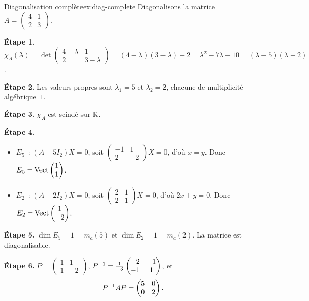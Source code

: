 \begin{example}{Diagonalisation complète}{ex:diag-complete}
  Diagonalisons la matrice
  $A=\begin{pmatrix}4&1\\2&3\end{pmatrix}$.

  \textbf{Étape 1.} $\chi_A(\lambda)=\det\begin{pmatrix}4-\lambda&1\\
  2&3-\lambda\end{pmatrix}=(4-\lambda)(3-\lambda)-2
  =\lambda^2-7\lambda+10=(\lambda-5)(\lambda-2)$.

  \textbf{Étape 2.} Les valeurs propres sont $\lambda_1=5$ et
  $\lambda_2=2$, chacune de multiplicité algébrique~$1$.

  \textbf{Étape 3.} $\chi_A$ est scindé sur ${\mathbb{R}}$.

  \textbf{Étape 4.}
  \begin{itemize}
    \item $E_5$~: $(A-5I_2)X=0$, soit
      $\begin{pmatrix}-1&1\\2&-2\end{pmatrix}X=0$, d'où $x=y$.
      Donc $E_5=\operatorname{Vect}\begin{pmatrix}1\\1\end{pmatrix}$.
    \item $E_2$~: $(A-2I_2)X=0$, soit
      $\begin{pmatrix}2&1\\2&1\end{pmatrix}X=0$, d'où $2x+y=0$.
      Donc $E_2=\operatorname{Vect}\begin{pmatrix}1\\-2\end{pmatrix}$.
  \end{itemize}

  \textbf{Étape 5.} $\dim E_5=1=m_a(5)$ et $\dim E_2=1=m_a(2)$.
  La matrice est diagonalisable.

  \textbf{Étape 6.}
  $P=\begin{pmatrix}1&1\\1&-2\end{pmatrix}$,
  ${P}^{-1}=\frac{1}{-3}\begin{pmatrix}-2&-1\\-1&1\end{pmatrix}$, et
  \[
    {P}^{-1}AP=\begin{pmatrix}5&0\\0&2\end{pmatrix}.
  \]
\end{example}

